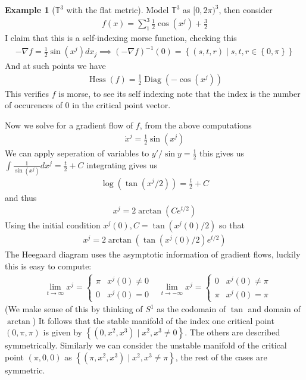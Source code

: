 \documentclass[10.5pt]{article}
\theoremstyle{definition}
\newtheorem{example}{Example}
\numberwithin{proposition}{subsection}
\numberwithin{pb}{subsection}
\newcommand{\set}[1]{\left\{#1\right\}}
\begin{document}
    \begin{example}[\(\mathbb{T}^3\) with the flat metric]
        Model \(\mathbb{T}^3\) as \([0,2\pi)^3\), then consider
        \begin{align}
            f(x) = \sum_1^3 \frac12 \cos(x^j) + \frac32
        \end{align}
        I claim that this is a self-indexing morse function, checking this
        \begin{align}
            -\nabla f = \frac12 \sin(x^j)dx_j \implies (-\nabla f)^{-1}(0) = \set{(s,t,r) \mid s,t,r \in \set{0,\pi}}
        \end{align}
        And at such points we have
        \begin{align}
            \operatorname{Hess}(f) = \frac12 \operatorname{Diag}(-\cos(x^j))
        \end{align}
        This verifies \(f\) is morse, to see its self indexing note that the index is the number of occurences of \(0\) in the critical point vector.

        Now we solve for a gradient flow of \(f\), from the above computations
        \begin{align}
            \dot{x}^j = \frac12 \sin(x^j)
        \end{align}
        We can apply seperation of variables to \(y'/\sin y = \frac12\) this gives us \(\int \frac{1}{\sin(x^j)} dx^j = \frac{t}{2} + C\) integrating gives us
        \begin{align}
            \log(\tan(x^j/2)) = \frac{t}{2} + C
        \end{align}
        and thus
        \begin{align}
            x^j = 2\arctan(C e^{t/2})
        \end{align}
        Using the initial condition \(x^j(0), C = \tan(x^j(0)/2)\) so that
        \begin{align}
            x^j = 2\arctan(\tan(x^j(0)/2) e^{t/2})
        \end{align}
        The Heegaard diagram uses the asymptotic information of gradient flows, luckily this is easy to compute:
        \begin{align}
            &\lim_{t\to\infty} x^j = \begin{cases}
                \pi & x^j(0) \neq 0 \\
                0 & x^j(0) = 0
            \end{cases} &\lim_{t\to-\infty} x^j = \begin{cases}
                0 &x^j(0) \neq \pi \\
                \pi &x^j(0) = \pi
            \end{cases}
        \end{align}
        (We make sense of this by thinking of \(S^1\) as the codomain of \(\tan\) and domain of \(\arctan\))
        It follows that the stable manifold of the index one critical point \((0,\pi,\pi)\) is given by \(\set{(0,x^2,x^3) \mid x^2,x^3 \neq 0}\). The others are described symmetrically. Similarly we can consider the unstable manifold of the critical point \((\pi,0,0)\) as \(\set{(\pi,x^2,x^3) \mid x^2,x^3 \neq \pi}\), the rest of the cases are symmetric.


\end{example}
\end{document}
